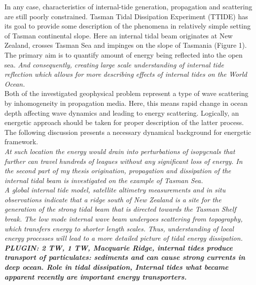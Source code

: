 In any case, characteristics of internal-tide generation, propagation and scattering are still poorly constrained. Tasman Tidal Dissipation Experiment (TTIDE) has its goal to provide some description of the phenomena in relatively simple setting of Tasman continental slope. Here an internal tidal beam originates at New Zealand, crosses Tasman Sea and impinges on the slope of Tasmania (Figure 1). The primary aim is to quantify amount of energy being reflected into the open sea.\textit{ And consequently, creating large scale understanding of internal tide reflection which allows for more describing effects of internal tides on the World Ocean.}\\
Both of the investigated geophysical problem represent a type of wave scattering by inhomogeneity in propagation media. Here, this means rapid change in ocean depth affecting wave dynamics and leading to energy scattering. Logically, an energetic approach should be taken for proper description of the latter process. The following discussion presents a  necessary dynamical background for energetic framework.\\
\textit{At such location the energy would drain into perturbations of isopycnals that further can travel hundreds of  leagues without any significant loss of energy. In the second part of my thesis origination, propagation and dissipation of the internal tidal beam is investigated on the example of Tasman Sea.\\
A global internal tide model, satellite altimetry measurements and in situ observations indicate that a ridge south of New Zealand is a site for the generation of the strong tidal beam that is directed towards the Tasman Shelf break. The low mode internal wave beam undergoes scattering from topography, which transfers energy to shorter length scales. Thus, understanding of local energy processes will lead to a more detailed picture of tidal energy dissipation.\\
\textbf{PLUGIN: 2 TW, 1 TW, Macquarie Ridge, internal tides produce transport of particulates: sediments and can cause strong currents in deep ocean. Role in tidal dissipation, Internal tides what became apparent recently are important energy transporters.}
}
\newpage

